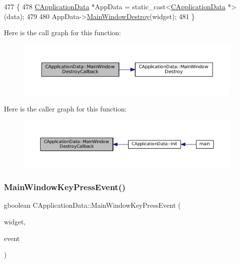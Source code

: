 \begin{DoxyCode}
477                                                                                 \{
478     \hyperlink{classCApplicationData}{CApplicationData} *AppData = \textcolor{keyword}{static\_cast<}\hyperlink{classCApplicationData}{CApplicationData} *\textcolor{keyword}{>}(data);
479 
480     AppData->\hyperlink{classCApplicationData_a202437b2380956a5519722937cd9f96a}{MainWindowDestroy}(widget);
481 \}
\end{DoxyCode}
Here is the call graph for this function\+:
\nopagebreak
\begin{figure}[H]
\begin{center}
\leavevmode
\includegraphics[width=350pt]{classCApplicationData_a379327c78dc57aa9dcef77e1b98efa2d_cgraph}
\end{center}
\end{figure}
Here is the caller graph for this function\+:
\nopagebreak
\begin{figure}[H]
\begin{center}
\leavevmode
\includegraphics[width=350pt]{classCApplicationData_a379327c78dc57aa9dcef77e1b98efa2d_icgraph}
\end{center}
\end{figure}
\hypertarget{classCApplicationData_a9b451765c93ecf00322f5450d29bfffe}{}\label{classCApplicationData_a9b451765c93ecf00322f5450d29bfffe} 
\subsubsection{\texorpdfstring{Main\+Window\+Key\+Press\+Event()}{MainWindowKeyPressEvent()}}
{\footnotesize\ttfamily gboolean C\+Application\+Data\+::\+Main\+Window\+Key\+Press\+Event (\begin{DoxyParamCaption}\item[{Gtk\+Widget $\ast$}]{widget,  }\item[{Gdk\+Event\+Key $\ast$}]{event }\end{DoxyParamCaption})\hspace{0.3cm}{\ttfamily [protected]}}




